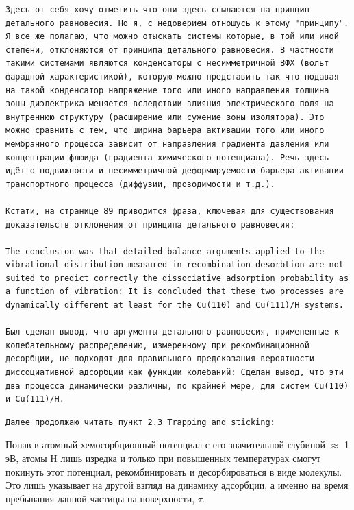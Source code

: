 \documentclass[11pt]{article}
\begin{document}
    \begin{verbatim}
Здесь от себя хочу отметить что они здесь ссылаются на принцип детального равновесия. Но я, с недоверием отношусь к этому "принципу". Я все же полагаю, что можно отыскать системы которые, в той или иной степени, отклоняются от принципа детального равновесия. В частности такими системами являются конденсаторы с несимметричной ВФХ (вольт фарадной характеристикой), которую можно представить так что подавая на такой конденсатор напряжение того или иного направления толщина зоны диэлектрика меняется вследствии влияния электрического поля на внутреннюю структуру (расширение или сужение зоны изолятора). Это можно сравнить с тем, что ширина барьера активации того или иного мембранного процесса зависит от направления градиента давления или концентрации флюида (градиента химического потенциала). Речь здесь идёт о подвижности и несимметричной деформируемости барьера активации транспортного процесса (диффузии, проводимости и т.д.).

Кстати, на странице 89 приводится фраза, ключевая для существования доказательств отклонения от принципа детального равновесия:

The conclusion was that detailed balance arguments applied to the vibrational distribution measured in recombination desorbtion are not suited to predict correctly the dissociative adsorption probability as a function of vibration: It is concluded that these two processes are dynamically different at least for the Cu(110) and Cu(111)/H systems.

Был сделан вывод, что аргументы детального равновесия, примененные к колебательному распределению, измеренному при рекомбинационной десорбции, не подходят для правильного предсказания вероятности диссоциативной адсорбции как функции колебаний: Сделан вывод, что эти два процесса динамически различны, по крайней мере, для систем Cu(110) и Cu(111)/H.
\end{verbatim}

    \begin{verbatim}
Далее продолжаю читать пункт 2.3 Trapping and sticking:
\end{verbatim}

Попав в атомный хемосорбционный потенциал с его значительной глубиной
\(\approx\) 1 эВ, атомы H лишь изредка и только при повышенных
температурах смогут покинуть этот потенциал, рекомбинировать и
десорбироваться в виде молекулы. Это лишь указывает на другой взгляд на
динамику адсорбции, а именно на время пребывания данной частицы на
поверхности, \(\tau\).
\end{document}
